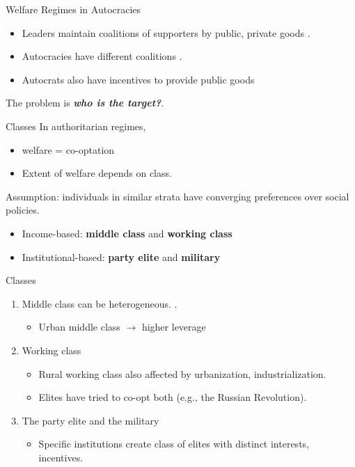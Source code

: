 \documentclass{Bredelebeamer}
\begin{document}
\begin{frame}{Welfare Regimes in Autocracies}
\begin{itemize}
	\item Leaders maintain coalitions of supporters by public, private goods \citep{BuenodeMesquita2003}.
	\item Autocracies have different coalitions \citep{Gandhi2009,Levitsky2010}.
	\item Autocrats also have incentives to provide public goods \citep{Wintrobe1998}
\end{itemize}
\vspace{0.3in}\pause
The problem is \textbf{\textit{who is the target?}}. %
\end{frame}

\begin{frame}{Classes}
In authoritarian regimes,
	\begin{itemize}
		\item welfare = co-optation
		\item Extent of welfare depends on class. %
	\end{itemize}
Assumption: individuals in similar strata have converging preferences over social policies.
	\begin{itemize}
		\item Income-based: \textbf{middle class} and \textbf{working class}
		\item Institutional-based: \textbf{party elite} and \textbf{military}
		\end{itemize}
\end{frame}

\begin{frame}{Classes}
\begin{enumerate}
	\item Middle class can be heterogeneous.
	\citep{Dahlum2019}. %
	\begin{itemize}
		\item Urban middle class $\rightarrow$ higher leverage %
	\end{itemize} 
	\item Working class
	\begin{itemize}
		\item Rural working class also affected by urbanization, industrialization.
		\item Elites have tried to co-opt both (e.g., the Russian Revolution).
	\end{itemize}
	\item The party elite and the military
	\begin{itemize}
		\item Specific institutions create class of elites with distinct interests, incentives.
	\end{itemize}
\end{enumerate}
\end{frame}
\end{document}
